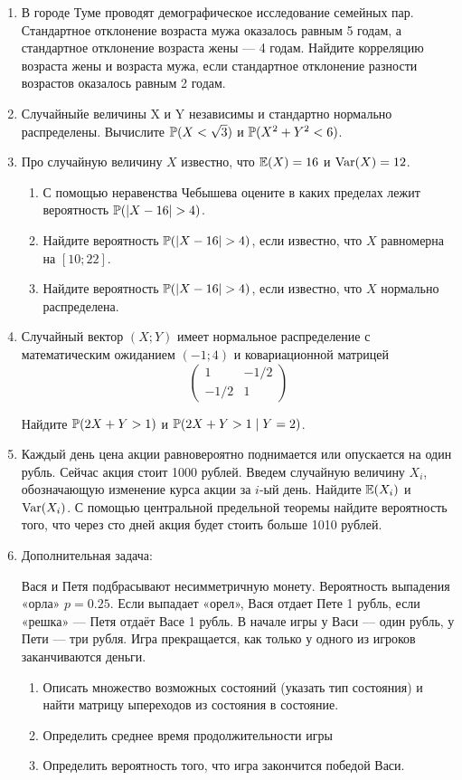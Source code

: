 \begin{enumerate}
\item В городе Туме проводят демографическое исследование семейных пар. Стандартное
отклонение возраста мужа оказалось равным 5 годам, а стандартное отклонение возраста
жены — 4 годам. Найдите корреляцию возраста жены и возраста мужа, если стандартное
отклонение разности возрастов оказалось равным 2 годам.
\item Случайныйе величины X и Y независимы и стандартно нормально распределены.
Вычислите $\P(X < \sqrt{3})$ и $\P(X^2 + Y^2 < 6)$.
\item  Про случайную величину $X$ известно, что $\E(X) = 16$ и $\Var(X) = 12$.
\begin{enumerate}
\item С помощью неравенства Чебышева оцените в каких пределах лежит вероятность
$\P(|X - 16| > 4)$.
\item Найдите вероятность $\P(|X - 16| > 4)$, если известно, что $X$ равномерна
на $[10;22]$.
\item Найдите вероятность $\P(|X - 16| > 4)$, если известно, что $X$ нормально
распределена.
\end{enumerate}

\item Случайный вектор $(X;Y)$ имеет нормальное распределение с математическим
ожиданием $(-1;4)$ и ковариационной матрицей
\[
\begin{pmatrix}
1 & -1/2 \\
-1/2 & 1
\end{pmatrix}
\]

Найдите $\P(2X+Y>1)$ и $\P(2X+Y>1 \mid Y=2)$.

\item Каждый день цена акции равновероятно поднимается или опускается на один рубль.
Сейчас акция стоит 1000 рублей. Введем случайную величину $X_i$, обозначающую
изменение курса акции за $i$-ый день. Найдите $\E(X_i)$  и $\Var(X_i)$. С помощью
центральной предельной теоремы найдите вероятность того, что через сто дней акция
будет стоить больше 1010 рублей.

\item Дополнительная задача:

Вася и Петя подбрасывают несимметричную монету. Вероятность выпадения «орла»
$p = 0.25$. Если выпадает «орел», Вася отдает Пете 1 рубль, если «решка» — Петя
отдаёт Васе 1 рубль. В начале игры у Васи — один рубль, у Пети — три рубля. Игра
прекращается, как только у одного из игроков заканчиваются деньги.
\begin{enumerate}
\item Описать множество возможных состояний (указать тип состояния) и найти матрицу
ыпереходов из состояния в состояние.
\item Определить среднее время продолжительности игры
\item Определить вероятность того, что игра закончится победой Васи.
\end{enumerate}
\end{enumerate}



